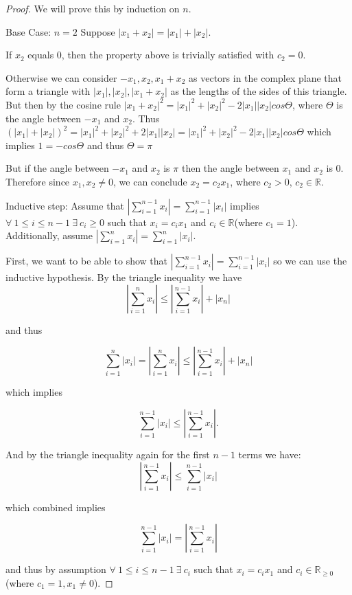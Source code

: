 \documentclass{amsart}
\theoremstyle{definition}
\theoremstyle{remark}
\numberwithin{equation}{section}
\begin{document}
\begin{proof}
We will prove this by induction on $n$.


Base Case: $n = 2$
Suppose $|x_1 + x_2| = |x_1| + |x_2|$.

If $x_2$ equals $0$, then the property above is trivially satisfied
with $c_2 = 0$.


Otherwise we can consider $-x_1, x_2, x_1 + x_2$ as vectors in the
complex plane that form a triangle with $|x_1|, |x_2|, |x_1 + x_2| $
as the lengths of the sides of this triangle. But then by the cosine
rule $|x_1 + x_2|^2 = |x_1|^2 + |x_2|^2 - 2|x_1||x_2|cos\Theta$,
where $\Theta$ is the angle between $-x_1$ and $x_2$. Thus $(|x_1| +
|x_2|)^2 = |x_1|^2 + |x_2|^2 + 2|x_1||x_2| = |x_1|^2 + |x_2|^2 -
2|x_1||x_2|cos\Theta$ which implies $1 = -cos\Theta$ and thus
$\Theta = \pi$

But if the angle between $-x_1$ and $x_2$ is $\pi$  then the angle
between $x_1$ and $x_2$ is $0$. Therefore since $x_1, x_2 \neq 0$,
we can conclude $x_2 = c_2x_1$, where $c_2 > 0$, $c_2 \in
\mathbb{R}$.


Inductive step:
Assume that $|\sum_{i = 1}^{n-1} x_i| = \sum_{i = 1}^{n-1}| x_i|$ implies $\forall\ 1 \leq i \leq n-1\ \exists\ c_i \geq 0$
such that $x_i = c_ix_1$ and $c_i \in \mathbb{R}$(where $c_1 = 1$).  Additionally, assume $|\sum_{i = 1}^{n} x_i| = \sum_{i = 1}^{n}| x_i|$.

First, we want to be able to show that $|\sum_{i = 1}^{n-1} x_i| = \sum_{i = 1}^{n-1}| x_i|$ so we can use the inductive hypothesis.
By the triangle inequality we have
$$|\sum_{i = 1}^{n} x_i|  \leq |\sum_{i = 1}^{n-1} x_i| + | x_n|$$

and thus

$$ \sum_{i = 1}^{n}| x_i| = |\sum_{i = 1}^{n} x_i|  \leq |\sum_{i = 1}^{n-1} x_i| + | x_n|$$

which implies

$$ \sum_{i = 1}^{n-1}| x_i| \leq |\sum_{i = 1}^{n-1} x_i|.$$


And by the triangle inequality again for the first $n-1$ terms we have:
$$ |\sum_{i = 1}^{n-1} x_i| \leq \sum_{i = 1}^{n-1}| x_i|$$


which combined implies

$$\sum_{i = 1}^{n-1}| x_i| = |\sum_{i = 1}^{n-1} x_i|$$

and thus by assumption $\forall\ 1 \leq i \leq n-1\ \exists\ c_i$ such that $x_i = c_ix_1$ and $c_i \in \mathbb{R}_{\geq 0}$ (where $c_1 = 1, x_1 \neq 0$).


\end{proof}
\end{document}
